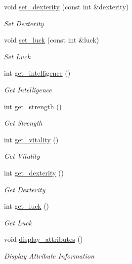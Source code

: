 \begin{DoxyCompactItemize}
void \mbox{\hyperlink{class_a_t_t_r_i_b_u_t_e_s_a2a08d7a27c465791aaae0e70cedafe65}{set\+\_\+dexterity}} (const int \&dexterity)
\begin{DoxyCompactList}\small\item\em Set Dexterity \end{DoxyCompactList}\item 
void \mbox{\hyperlink{class_a_t_t_r_i_b_u_t_e_s_aaccae64810ea2e0516cb1250da213641}{set\+\_\+luck}} (const int \&luck)
\begin{DoxyCompactList}\small\item\em Set Luck \end{DoxyCompactList}\item 
int \mbox{\hyperlink{class_a_t_t_r_i_b_u_t_e_s_a4860d81830e28f8e8009f7212f1b347e}{get\+\_\+intelligence}} ()
\begin{DoxyCompactList}\small\item\em Get Intelligence \end{DoxyCompactList}\item 
int \mbox{\hyperlink{class_a_t_t_r_i_b_u_t_e_s_a5f4c39740f83ccedc3c50307393fd9d8}{get\+\_\+strength}} ()
\begin{DoxyCompactList}\small\item\em Get Strength \end{DoxyCompactList}\item 
int \mbox{\hyperlink{class_a_t_t_r_i_b_u_t_e_s_a0cfde0f6a98f751899ddc26324363ccc}{get\+\_\+vitality}} ()
\begin{DoxyCompactList}\small\item\em Get Vitality \end{DoxyCompactList}\item 
int \mbox{\hyperlink{class_a_t_t_r_i_b_u_t_e_s_ac4b16d40bc6fbea609cf3c3bda5dd403}{get\+\_\+dexterity}} ()
\begin{DoxyCompactList}\small\item\em Get Dexterity \end{DoxyCompactList}\item 
int \mbox{\hyperlink{class_a_t_t_r_i_b_u_t_e_s_a09fe85866eb5b0c1bc358176e7eab7cc}{get\+\_\+luck}} ()
\begin{DoxyCompactList}\small\item\em Get Luck \end{DoxyCompactList}\item 
void \mbox{\hyperlink{class_a_t_t_r_i_b_u_t_e_s_ac1653b73b37c39c05aa08abb4885d579}{display\+\_\+attributes}} ()
\begin{DoxyCompactList}\small\item\em Display Attribute Information \end{DoxyCompactList}\end{DoxyCompactItemize}


